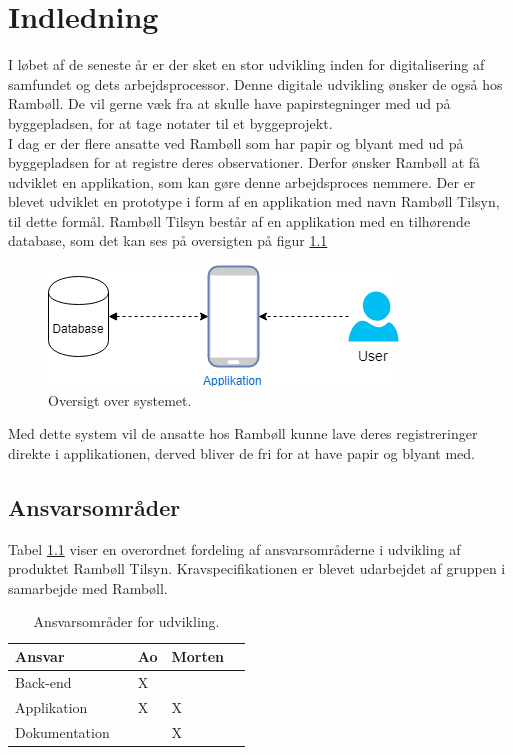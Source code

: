 \chapter{Indledning}

I løbet af de seneste år er der sket en stor udvikling inden for digitalisering af samfundet og dets arbejdsprocessor\cite{Erhverv}. Denne digitale udvikling ønsker de også hos Rambøll. De vil gerne væk fra at skulle have papirstegninger med ud på byggepladsen, for at tage notater til et byggeprojekt. \\
I dag er der flere ansatte ved Rambøll som har papir og blyant med ud på byggepladsen for at registre deres observationer. Derfor ønsker Rambøll at få udviklet en applikation, som kan gøre denne arbejdsproces nemmere.
Der er blevet udviklet en prototype i form af en applikation med navn Rambøll Tilsyn, til dette formål.
Rambøll Tilsyn består af en applikation med en tilhørende database, som det kan ses på oversigten på figur \ref{fig:OversigtSystembeskrivelse}


\begin{figure}[H]
	\centering
	\includegraphics[width=0.4\linewidth]{Indledning/Oversigtoversystem}
	\caption{Oversigt over systemet.}
	\label{fig:OversigtSystembeskrivelse}
\end{figure}

Med dette system vil de ansatte hos Rambøll kunne lave deres registreringer direkte i applikationen, derved bliver de fri for at have papir og blyant med. \\

\section*{Ansvarsområder}
Tabel \ref{Produktansvar} viser en overordnet fordeling af ansvarsområderne i udvikling af produktet Rambøll Tilsyn. Kravspecifikationen er blevet udarbejdet af gruppen i samarbejde med Rambøll. \\

\begin{table}[H]
	\centering
	\begin{tabular}{lllll} \hline
		\textbf{Ansvar} &  & \textbf{Ao}&  \textbf{Morten}&  \\ \hline
		Back-end&  &  X&  &  \\ \hline
		Applikation&  &  X&  X&  \\ \hline
		Dokumentation& & & X& \\ \hline
	\end{tabular}
	\caption{Ansvarsområder for udvikling.}
	\label{Produktansvar}
\end{table}